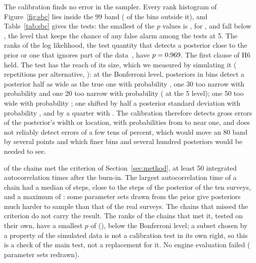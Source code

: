 The calibration finds no error in the sampler. Every rank histogram of Figure~\ref{fig:sbc} lies inside the 99\pct{} band
(\sbcOutsideBand{} of the \sbcAllBins{} bins outside it), and Table~\ref{tab:sbc} gives the tests: the smallest of the
\sbcQuantities{} $p$ values is \sbcMinP{}, for \sbcMinPName, and \sbcBelowBonf{} fall below \sbcBonfP, the level that keeps the
chance of any false alarm among the \sbcQuantities{} tests at 5\pct. The ranks of the log likelihood, the test quantity that
detects a posterior close to the prior or one that ignores part of the data~\cite{modrak}, have $p=0.969$. The first clause of
H6 held. The test has the reach of its size, which we measured by simulating it (\sbcPowReps{} repetitions per alternative,
): at the Bonferroni level, \sbcN{} posteriors in \sbcBins{} bins detect a posterior half as wide as
the true one with probability \sbcPowHalf, one 30\pct{} too narrow with probability \sbcPowSeventy{} and one 20\pct{} too narrow
with probability \sbcPowEighty{} (\sbcPowEightyNom{} at the 5\pct{} level); one 50\pct{} too wide with probability \sbcPowWide;
one shifted by half a posterior standard deviation with probability \sbcPowShiftHalf, and by a quarter with \sbcPowShiftQuarter.
The calibration therefore detects gross errors of the posterior's width or location, with probabilities from \sbcPowWide{} to
near one, and does not reliably detect errors of a few tens of percent, which would move an 80\pct{} band by several points and
which finer bins and several hundred posteriors would be needed to see.

\sbcConverged{} of the \sbcN{} chains met the criterion of Section~\ref{sec:method}, at least 50 integrated autocorrelation
times after the burn-in. The largest autocorrelation time of a chain had a median of \sbcTauMedian{} steps, close to the
\tauTen{} steps of the posterior of the ten surveys, and a maximum of \sbcTauMax: some parameter sets drawn from the prior give
posteriors much harder to sample than that of the real surveys. The \sbcNotConverged{} chains that missed the criterion do not
carry the result. The ranks of the \sbcConverged{} chains that met it, tested on their own, have a smallest $p$ of
\sbcConvMinP{} (\sbcConvMinPName), \sbcConvBelowBonf{} below the Bonferroni level; a subset chosen by a property of the
simulated data is not a calibration test in its own right, so this is a check of the main test, not a replacement for it. No
engine evaluation failed (\sbcRedraws{} parameter sets redrawn).

